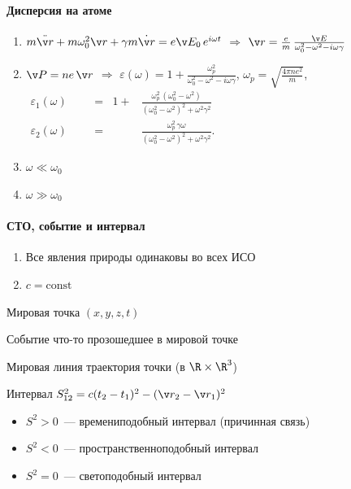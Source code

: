 \documentclass{trchesh}
\newcommand{\deflabel}[1]{
  \makebox[\labelwidth][l]{%
    \parbox[t]{\labelwidth}{\hspace{0pt}\textsf{#1}}%
  }~::
}
\newenvironment{defs}[1][\hspace{12ex}]%
  {\begin{list}{}{%
        \let \makelabel=\deflabel%
        \setlength{\labelwidth}{\widthof{#1}} %
        \setlength{\leftmargin}{\labelwidth+\labelsep}%
        \itemsep=0pt %
      }}%
  {\end{list}}
\begin{document}
\begin{multicols*}{3}
\paragraph{Дисперсия на атоме}
\begin{enumerate}
  \item $m\ddot{\v r} + m \omega_0^2 \v r + \gamma m \dot{\v r} = e \v E_0 \, e^{i \omega t}$
    $ \Rightarrow$ $\v r = \frac em \, \frac{\v E}{\omega_0^2 - \omega^2 - i \omega \gamma} $
  \item $\v P = n e\, \v r$ $ \Rightarrow$ $\varepsilon(\omega) 
    = 1 + \frac{\omega_p^2}{\omega_0^2 - \omega^2 - i \omega \gamma}$, 
    $\omega_p = \textstyle\sqrt{\frac{4 \pi n e^2}{m}}$, \\
    $
    \begin{aligned}
      \varepsilon_1(\omega)& &&=& 1 + 
      &\frac{\omega_p^2 \, (\omega_0^2 - \omega^2)}{(\omega_0^2 - \omega^2)^2 + \omega^2 \gamma^2} \\
      \varepsilon_2(\omega)& &&=& 
      &\frac{\omega_p^2 \, \gamma \omega}{(\omega_0^2 - \omega^2)^2 + \omega^2 \gamma^2}.
    \end{aligned}
    $
  \item $\omega \ll \omega_0$
  \item $\omega \gg \omega_0$
\end{enumerate}

\paragraph{СТО, событие и интервал}
\begin{enumerate}
  \item Все явления природы одинаковы во всех ИСО
  \item $c=\textrm{const}$
\end{enumerate}

\begin{defs}
  \item[Мировая точка] $(x,y,z,t)$
  \item[Событие] что-то прозошедшее в мировой точке
  \item[Мировая линия] траектория точки (в $\R \times \R^3$)
  \item[Интервал] $S_{12}^2 = c(t_2 - t_1)^2 - (\v r_2 - \v r_1)^2$
\end{defs}
\begin{itemize}
  \item $S^2 > 0$~--- времениподобный интервал (причинная связь)
  \item $S^2 < 0$~--- пространственноподобный интервал 
  \item $S^2 = 0$~--- светоподобный интервал
\end{itemize}


\end{multicols*}
\end{document}
